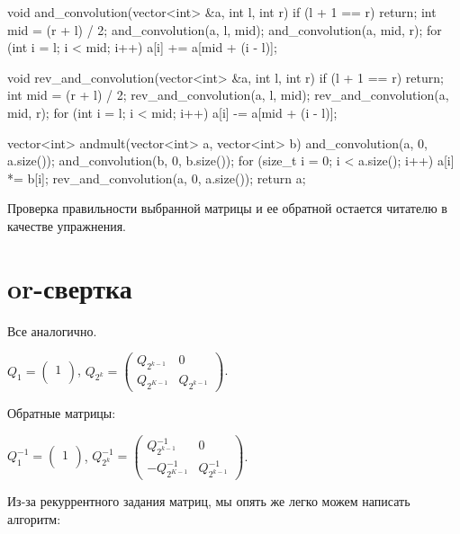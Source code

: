 \begin{code}
    
void and_convolution(vector<int> &a, int l, int r) {
    if (l + 1 == r) {
        return;
    }
    int mid = (r + l) / 2;
    and_convolution(a, l, mid);
    and_convolution(a, mid, r);
    for (int i = l; i < mid; i++) {
        a[i] += a[mid + (i - l)];
    }
}

void rev_and_convolution(vector<int> &a, int l, int r) {
    if (l + 1 == r) {
        return;
    }
    int mid = (r + l) / 2;
    rev_and_convolution(a, l, mid);
    rev_and_convolution(a, mid, r);
    for (int i = l; i < mid; i++) {
        a[i] -= a[mid + (i - l)];
    }
}

vector<int> andmult(vector<int> a, vector<int> b) {
    and_convolution(a, 0, a.size());
    and_convolution(b, 0, b.size());
    for (size_t i = 0; i < a.size(); i++) {
        a[i] *= b[i];
    }
    rev_and_convolution(a, 0, a.size());
    return a;
}

\end{code}

Проверка правильности выбранной матрицы и ее обратной остается читателю в качестве упражнения.


\section{or-свертка}

Все аналогично.

$Q_1 = \begin{pmatrix}
    1\\
\end{pmatrix}
$,
$
Q_{2^k} =  \begin{pmatrix}
    Q_{2^{k - 1}} & 0\\
    Q_{2^{K - 1}} & Q_{2^{k - 1}}
\end{pmatrix}
$.


Обратные матрицы:

$Q_1^{-1} = \begin{pmatrix}
    1\\
\end{pmatrix}
$,
$
Q_{2^k}^{-1} =  \begin{pmatrix}
    Q_{2^{k - 1}}^{-1} & 0\\
    -Q_{2^{K - 1}}^{-1} & Q_{2^{k - 1}}^{-1}
\end{pmatrix}
$.


Из-за рекуррентного задания матриц, мы опять же легко можем написать алгоритм:

